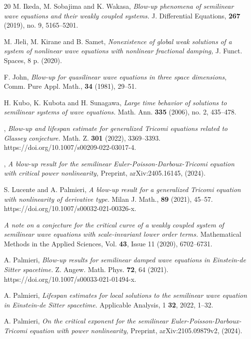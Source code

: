 \documentclass[12pt,leqno]{amsart}
\numberwithin{equation}{section}
\theoremstyle{remark}
\begin{document}
\begin{thebibliography}{20}
M. Ikeda, M. Sobajima and K. Wakasa,
{\it Blow-up phenomena of semilinear wave equations and their weakly coupled systems.} 
J. Differential Equations, {\bf 267} (2019), no. 9, 5165–5201.

M. Jleli, M.  Kirane and B.  Samet, 
{\it Nonexistence of global weak solutions of a system of nonlinear wave equations with nonlinear fractional damping,} 
J. Funct. Spaces, 8 p. (2020).

{F. John}, {\it Blow-up for quasilinear wave equations in three space dimensions}, Comm. Pure Appl. Math., {\bf 34} (1981), 29--51.

{H. Kubo, K. Kubota and H. Sunagawa,} 
{\it Large time behavior of solutions to semilinear systems of wave equations.}
Math. Ann. {\bf 335} (2006), no. 2, 435--478.


,
{\it Blow-up and lifespan estimate for generalized Tricomi equations related to Glassey conjecture.} 	Math. Z. {\bf 301}  (2022), 3369--3393. https://doi.org/10.1007/s00209-022-03017-4.



,
{\it A blow-up result for the semilinear Euler-Poisson-Darboux-Tricomi equation with critical power nonlinearity, } 
Preprint, 	arXiv:2405.16145, (2024).


 S. Lucente and A. Palmieri, 
{\it A blow-up result for a generalized Tricomi equation with
nonlinearity of derivative type.} Milan J. Math., {\bf 89}  (2021), 45--57. https://doi.org/10.1007/s00032-021-00326-x.


 {\it A note on a conjecture for the critical curve of a weakly coupled system of semilinear wave equations with scale-invariant lower order terms. } Mathematical Methods in the Applied Sciences, Vol. {\bf 43}, Issue 11 (2020), 6702--6731.

 A. Palmieri, 
{\it Blow-up results for semilinear damped wave equations in
Einstein-de Sitter spacetime.} Z. Angew. Math. Phys. {\bf 72}, 64 (2021). https://doi.org/10.1007/s00033-021-01494-x.

 A. Palmieri, 
{\it Lifespan estimates for local solutions to the semilinear wave equation in Einstein-de
Sitter spacetime.} Applicable Analysis, 1 {\bf 32}, 2022, 1--32.

 A. Palmieri, 
{\it On the critical exponent for the semilinear
Euler-Poisson-Darboux-Tricomi equation with power
nonlinearity,} Preprint, 	 arXiv:2105.09879v2, (2024).




\end{thebibliography}
\end{document}
